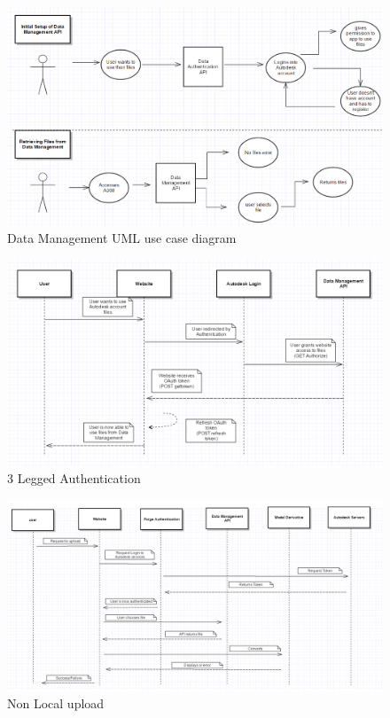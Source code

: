 \documentclass[letterpaper, 10pt, draftclsnofoot, compsoc, onecolumn]{IEEEtran}
\begin{document}
\newpage
\begin{figure}[ht]
	\includegraphics[scale=0.6]{DataManageUseCase.png}
	\caption{Data Management UML use case diagram}
\end{figure}
\newpage
\begin{figure}[ht]
	\includegraphics[scale=0.6]{Authentication3legged.png}
	\caption{3 Legged Authentication}
\end{figure}
\newpage
\begin{figure}[ht]
	\includegraphics[scale=0.4]{nonLocalUpload.png}
	\caption{Non Local upload }
\end{figure}
\end{document}

